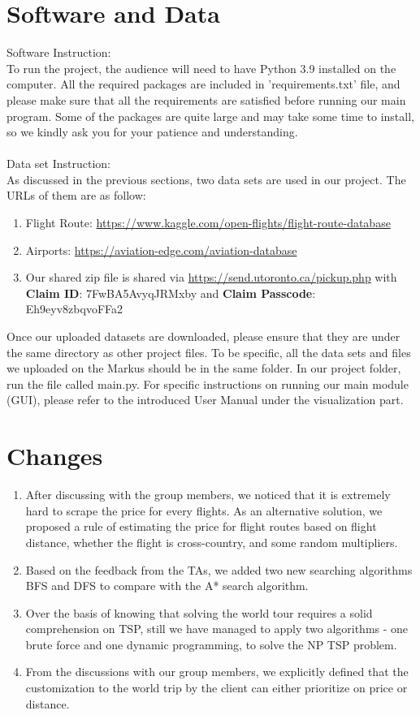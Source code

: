 \documentclass[fontsize=11pt]{article}
\begin{document}
\section*{Software and Data}
    Software Instruction:\\
    To run the project, the audience will need to have Python 3.9 installed on the computer. All the required packages are included in 'requirements.txt' file, and please make sure that all the requirements are satisfied before running our main program. Some of the packages are quite large and may take some time to install, so we kindly ask you for your patience and understanding.\\\\
    Data set Instruction:\\
    As discussed in the previous sections, two data sets are used in our project. The URLs of them are as follow:
    \begin{enumerate}
        \item Flight Route:
        \url{https://www.kaggle.com/open-flights/flight-route-database}
        \item Airports: \url{https://aviation-edge.com/aviation-database}
        \item Our shared zip file is shared via \url{https://send.utoronto.ca/pickup.php} with \textbf{Claim ID}: 7FwBA5AvyqJRMxby and \textbf{Claim Passcode}: Eh9eyv8zbqvoFFa2
    \end{enumerate}
    Once our uploaded datasets are downloaded, please ensure that they are under the same directory as other project files. To be specific, all the data sets and files we uploaded on the Markus should be in the same folder. In our project folder, run the file called main.py. For specific instructions on running our main module (GUI), please refer to the introduced User Manual under the visualization part.

\section*{Changes}

\begin{enumerate}
    \item After discussing with the group members, we noticed that it is extremely hard to scrape the price for every flights. As an alternative solution, we proposed a rule of 
    estimating the price for flight routes based on flight distance, whether the flight is cross-country, and some random multipliers.
    \item Based on the feedback from the TAs, we added two new searching algorithms BFS and DFS to compare with the A* search algorithm.
    \item Over the basis of knowing that solving the world tour requires a solid comprehension on TSP, still we have managed to apply two algorithms - one brute force and one dynamic programming, to solve the NP TSP problem.
    \item From the discussions with our group members, we explicitly defined that the customization to the world trip by the client can either prioritize on price or distance.

\end{enumerate}
\end{document}
